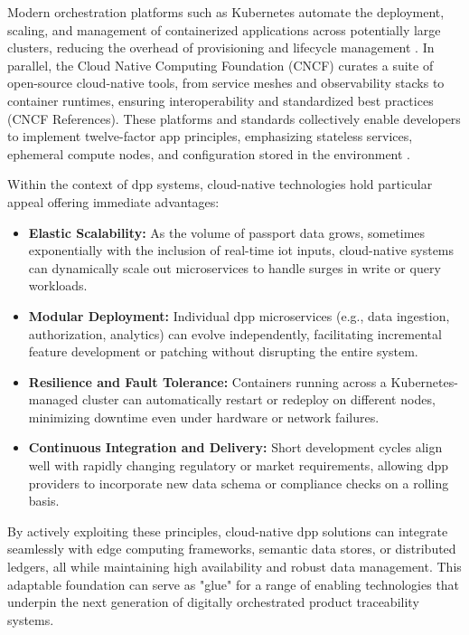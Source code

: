Modern orchestration platforms such as Kubernetes automate the deployment, scaling, and management of containerized applications across potentially large clusters, reducing the overhead of provisioning and lifecycle management \autocite{Burns.2016}. In parallel, the Cloud Native Computing Foundation (CNCF) curates a suite of open-source cloud-native tools, from service meshes and observability stacks to container runtimes, ensuring interoperability and standardized best practices (CNCF References). These platforms and standards collectively enable developers to implement twelve-factor app principles, emphasizing stateless services, ephemeral compute nodes, and configuration stored in the environment \autocite{Wiggins.2017, CNCF.n.d.}.

Within the context of \acrlong{dpp} systems, cloud-native technologies hold particular appeal offering immediate advantages:

\begin{itemize}[itemsep=0.5\baselineskip]
    \item \textbf{Elastic Scalability:} As the volume of passport data grows, sometimes exponentially with the inclusion of real-time \ac{iot} inputs, cloud-native systems can dynamically scale out microservices to handle surges in write or query workloads. \autocite{Armbrust.2010}
    
    \item \textbf{Modular Deployment:} Individual \ac{dpp} microservices (e.g., data ingestion, authorization, analytics) can evolve independently, facilitating incremental feature development or patching without disrupting the entire system. \autocite{Dragoni.2017}
    
    \item \textbf{Resilience and Fault Tolerance:} Containers running across a Kubernetes-managed cluster can automatically restart or redeploy on different nodes, minimizing downtime even under hardware or network failures. \autocite{Burns.2016}
    
    \item \textbf{Continuous Integration and Delivery:} Short development cycles align well with rapidly changing regulatory or market requirements, allowing \ac{dpp} providers to incorporate new data schema or compliance checks on a rolling basis. \autocite{Balalaie.2016}
\end{itemize}

By actively exploiting these principles, cloud-native \ac{dpp} solutions can integrate seamlessly with edge computing frameworks, semantic data stores, or distributed ledgers, all while maintaining high availability and robust data management. This adaptable foundation can serve as "glue" for a range of enabling technologies that underpin the next generation of digitally orchestrated product traceability systems.

